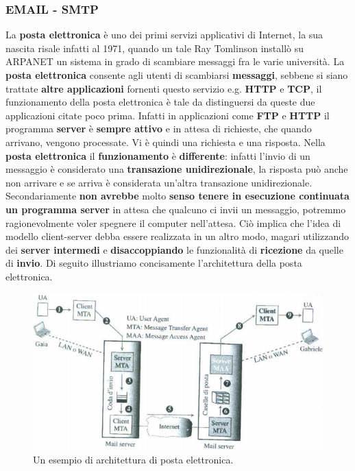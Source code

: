 \documentclass[11pt,a4paper]{article}
\theoremstyle{definition}
\begin{document}
\subsubsection{EMAIL - SMTP}
\label{sec:SMTP}
La \textbf{posta elettronica} è uno dei primi servizi applicativi di Internet, la sua nascita risale infatti al 1971, quando un tale Ray Tomlinson installò su ARPANET un sistema in grado di scambiare messaggi fra le varie università. La \textbf{posta elettronica} consente agli utenti di scambiarsi \textbf{messaggi}, sebbene si siano trattate \textbf{altre applicazioni} fornenti questo servizio e.g. \textbf{HTTP} e \textbf{TCP}, il funzionamento della posta elettronica è tale da distinguersi da queste due applicazioni citate poco prima. Infatti in applicazioni come \textbf{FTP} e \textbf{HTTP} il programma \textbf{server} è \textbf{sempre attivo} e in attesa di richieste, che quando arrivano, vengono processate.
Vi è quindi una richiesta e una risposta. Nella \textbf{posta elettronica} il \textbf{funzionamento} è \textbf{differente}: infatti l'invio di un messaggio è considerato una \textbf{transazione unidirezionale}, la risposta può anche non arrivare e se arriva è considerata un'altra transazione unidirezionale. Secondariamente \textbf{non avrebbe} molto \textbf{senso tenere in esecuzione continuata un programma server} in attesa che qualcuno ci invii un messaggio, potremmo ragionevolmente voler spegnere il computer nell'attesa. Ciò implica che l'idea di modello client-server debba essere realizzata in un altro modo, magari utilizzando dei \textbf{server intermedi} e \textbf{disaccoppiando} le funzionalità di \textbf{ricezione} da quelle di \textbf{invio}. Di seguito illustriamo concisamente l'architettura della posta elettronica.
\begin{figure}[!h]
	\includegraphics[scale=0.5]{Immagini/MAIL.png}
	\centering
	\caption{Un esempio di architettura di posta elettronica.}
\end{figure}\newline
\end{document}
